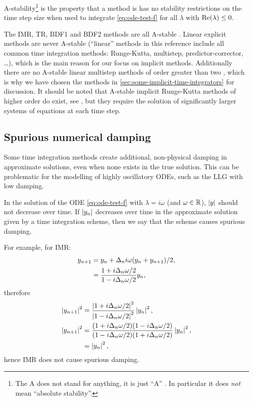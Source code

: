 A-stability\footnote{The A does not stand for anything, it is just ``A'' \cite[40]{HairerWanner}. In particular it does \emph{not} mean ``absolute stability''.} is the property that a method is has no stability restrictions on the time step size when used to integrate \cref{eq:ode-test-f} for all $\lambda$ with $\operatorname{Re}(\lambda) \leq 0$.

The IMR, TR, BDF1 and BDF2 methods are all A-stable \cite[pgs. 43, 251]{HairerWanner}.
Linear explicit methods are never A-stable \cite{Nevanlinna1974} (``linear'' methods in this reference include all common time integration methods: Runge-Kutta, multistep, predictor-corrector, \ldots), which is the main reason for our focus on implicit methods.
Additionally there are no A-stable linear multistep methods of order greater than two \cite[261]{GreshoSani}, which is why we have chosen the  methods in \cref{sec:some-implicit-time-integrators} for discussion.
It should be noted that A-stable implicit Runge-Kutta methods of higher order do exist, see \eg \cite[73]{HairerWanner}, but they require the solution of significantly larger systems of equations at each time step.

\subsection{Spurious numerical damping}
\label{sec:numerical-damping}

Some time integration methods create additional, non-physical damping in approximate solutions, even when none exists in the true solution.
This can be problematic for the modelling of highly oscillatory ODEs, such as the LLG with low damping.

In the solution of the ODE \cref{eq:ode-test-f} with $\lambda = i\omega$ (and $\omega \in \mathbb{R}$), $\left|{y} \right|$ should not decrease over time.
If $\left|{y_n} \right|$ decreases over time in the approximate solution given by a time integration scheme, then we say that the scheme causes spurious damping.

For example, for IMR:
\begin{equation}
  \begin{aligned}
    y_{n+1} &= y_n + \Delta_{n} i \omega (y_n + y_{n+1})/2, \\
    &= \frac{1 + i\Delta_{n} \omega/2}{1 - i\Delta_{n} \omega/2} y_n,
  \end{aligned}
\end{equation}
therefore
\begin{equation}
  \begin{aligned}
    \left|{y_{n+1}} \right|^2 &=  \frac{\left|{1 + i\Delta_{n} \omega/2} \right|^2}{\left|{1 - i\Delta_{n} \omega/2} \right|^2} \left|{y_n} \right|^2, \\
    \left|{y_{n+1}} \right|^2 &=  \frac{(1 + i\Delta_{n} \omega/2)(1 - i\Delta_{n} \omega/2)}
    {(1 - i\Delta_{n} \omega/2)(1 + i\Delta_{n} \omega/2)} \left|{y_n} \right|^2, \\
    &=  \left|{y_n} \right|^2,
  \end{aligned}
\end{equation}
hence IMR does not cause spurious damping.

